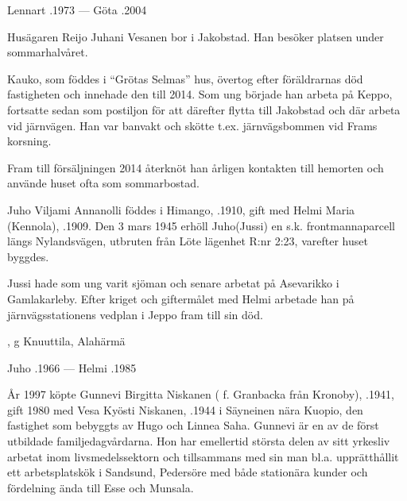 Lennart .1973  ---  Göta .2004


%



%
Husägaren Reijo Juhani Vesanen bor i Jakobstad. Han besöker platsen under sommarhalvåret.\jhvspace{}


%
Kauko, som föddes i ``Grötas Selmas'' hus, övertog efter föräldrarnas död fastigheten och innehade den till 2014. Som ung började han arbeta på Keppo, fortsatte sedan som postiljon för att därefter flytta till Jakobstad och där arbeta vid järnvägen. Han var banvakt och skötte t.ex. järnvägsbommen vid Frams korsning.

Fram till försäljningen 2014 återknöt han årligen kontakten till hemorten och använde huset ofta som sommarbostad.


%
Juho Viljami Annanolli föddes i Himango, .1910, gift med Helmi Maria (Kennola), .1909. Den 3 mars 1945 erhöll Juho(Jussi) en s.k. frontmannaparcell längs Nylandsvägen, utbruten från Löte lägenhet R:nr 2:23, varefter huset byggdes.

Jussi hade som ung varit sjöman och senare arbetat på Asevarikko i Gamlakarleby. Efter kriget och giftermålet med Helmi arbetade han på järnvägsstationens vedplan i Jeppo fram till sin död.
\begin{jhchildren}
  \item {}
  \item {}, g Knuuttila, Alahärmä
\end{jhchildren}

Juho .1966  ---  Helmi .1985



%



%
År 1997 köpte Gunnevi Birgitta Niskanen ( f. Granbacka från Kronoby), .1941, gift 1980 med Vesa Kyösti Niskanen, .1944 i Säyneinen nära Kuopio, den fastighet som bebyggts av Hugo och Linnea Saha. Gunnevi är en av de först utbildade familjedagvårdarna. Hon har emellertid största delen av sitt yrkesliv arbetat inom livsmedelssektorn och tillsammans med sin man bl.a. upprätthållit ett arbetsplatskök i Sandsund, Pedersöre med både stationära kunder och fördelning ända till Esse och Munsala.

